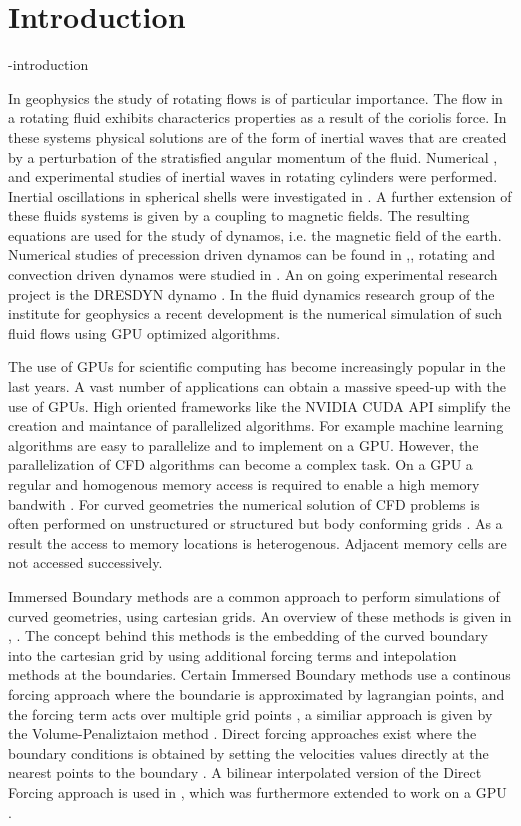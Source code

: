 \chapter{Introduction}
-introduction

In geophysics the study of rotating flows is of particular importance.
The flow in a rotating fluid exhibits characterics properties as a result of the coriolis force.
In these systems physical solutions are of the form of inertial waves
that are created by a perturbation of the stratisfied angular momentum of the fluid.
Numerical \citep{Sauret2012}, \citep{Duguet} and experimental studies \citep{QUOTE} of inertial waves in rotating cylinders were performed.
Inertial oscillations in spherical shells were investigated in \citep{Tilgner1999}.
A further extension of these fluids systems is given by a coupling to magnetic fields.
The resulting equations are used for the study of dynamos, i.e. the magnetic field of the earth.
Numerical studies of precession driven dynamos can be found in \citep{Tilgner2005},\citep{Tilgner2007a},
rotating and convection driven dynamos were studied in \citep{Tilgner2012}.
An on going experimental research project is the DRESDYN dynamo \citep{Stefani2015}.
In the fluid dynamics research group of the institute for geophysics
a recent development is the numerical simulation of such fluid flows using GPU optimized algorithms.

The use of GPUs for scientific computing has become increasingly popular in the last years.
A vast number of applications  can obtain a massive speed-up with the use of GPUs.
High oriented frameworks like the NVIDIA CUDA API simplify the creation
and maintance of parallelized algorithms.
For example machine learning algorithms are easy to parallelize and to implement on a GPU.
However, the parallelization of CFD algorithms can become a complex task.
On a GPU a regular and homogenous memory access is required to enable a high memory bandwith \citep{CUDABP}.
For curved geometries the numerical solution of CFD problems is often performed
on unstructured  or structured but body conforming grids \citep{Mittal2005}.
As a result the access to memory locations is heterogenous.
Adjacent memory cells are not accessed successively.

Immersed Boundary methods are a common approach to perform simulations of curved geometries, using cartesian grids.
An overview of these methods is given in \citep{Mittal2005}, \citep{Gornak2013}.
The concept behind this methods is the embedding of the curved boundary into the cartesian grid
by using additional forcing terms and intepolation methods at the boundaries.
Certain Immersed Boundary methods use a continous forcing approach where the boundarie is approximated by lagrangian points,
and the forcing term acts over multiple grid points \citep{Mittal2005}, a
similiar approach is given by the Volume-Penaliztaion method \citep{Lulff2011}.
Direct forcing approaches exist where the boundary conditions is obtained by setting the
velocities values directly at the nearest points to the boundary \citep{Fadlun2000}.
A bilinear interpolated version of the Direct Forcing approach is used in \citep{Gornak2013},
which was furthermore extended to work on a GPU \citep{DeLeon2012}.


